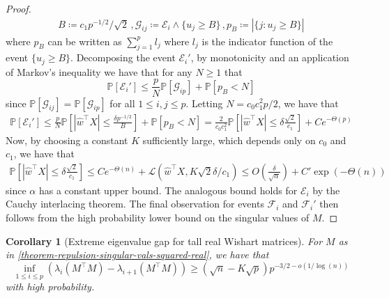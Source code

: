 \documentclass[11pt]{article}
\numberwithin{equation}{section}
\newtheorem{corollary}{Corollary}[section]
\theoremstyle{remark}
\newcommand{\LevyFunc}{\mathcal{L}}
\newcommand{\event}{\mathcal{E}}
\begin{document}
\begin{proof}
    \begin{align*}
        B \coloneqq c_1 p^{-1/2}/\sqrt{2} \, ,
        \mathcal{G}_{ij} \coloneqq \event_i \wedge \{u_j \geq B \} \, ,
        p_B \coloneqq |\{j : u_j \geq B \}|
    \end{align*}
    where $p_B$ can be written as $\sum_{j = 1}^{p}l_{j}$ where $l_j$ is the indicator function of the event $\{u_j \geq B \}$. Decomposing the event $\event_i'$, by monotonicity and an application of Markov's inequality we have that for any $N \geq 1$ that 
    \begin{equation*}
        \mathbb{P}[\event_i'] \leq \frac{p}{N}\mathbb{P}[\mathcal{G}_{ip}] + \mathbb{P}[p_B < N]
    \end{equation*}
    since $\mathbb{P}[\mathcal{G}_{ij}] = \mathbb{P}[\mathcal{G}_{ip}]$ for all $1 \leq i, j \leq p$. Letting $N = c_0c_1^2 p/2$, we have that 
    \begin{align*}
        \mathbb{P}[\event_i'] \leq \frac{p}{N}\mathbb{P}[|\hat{w}^\top  X| \leq \frac{\delta p^{-1/2}}{B}] + \mathbb{P}[p_B < N] = \frac{2}{c_0 c_1^2}\mathbb{P}[|\hat{w}^\top  X| \leq \delta\frac{\sqrt{2}}{c_1}] + Ce^{-\Theta(p)}
    \end{align*}
    Now, by choosing a constant $K$ sufficiently large, which depends only on $c_0$ and $c_1$, we have that
    \begin{align*}
        \mathbb{P}[|\hat{w}^\top  X| \leq \delta\frac{\sqrt{2}}{c_1}] \leq Ce^{-\Theta(n)} + \LevyFunc(\hat{w}^\top  X, K \sqrt{2}\delta / c_1) \leq O(\frac{\delta}{\sqrt{\alpha}}) + C' \exp(-\Theta(n))
    \end{align*}
    since $\alpha$ has a constant upper bound. The analogous bound holds for $\event_i$ by the Cauchy interlacing theorem. The final observation for events $\mathcal{F}_i$ and $\mathcal{F}_i'$ then follows from the high probability lower bound on the singular values of $M$.
\end{proof}

\begin{corollary}[Extreme eigenvalue gap for tall real Wishart matrices]\label{cor-extreme-gap-real}
    For $M$ as in \cref{theorem-repulsion-singular-vals-squared-real}, we have that 
    \begin{equation*}
        \inf_{1 \leq i \leq p}(\lambda_i(M^\top  M) - \lambda_{i + 1}(M^\top  M)) \geq (\sqrt{n} - K\sqrt{p})p^{-3/2 - o(1/\log(n))}
    \end{equation*}
    with high probability. 
\end{corollary}
\end{document}

